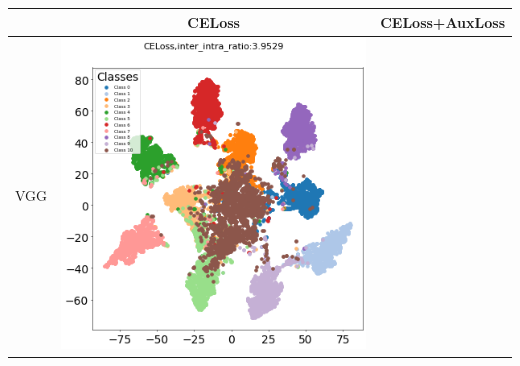 \begin{table}[H]
\captionsetup{font=small, justification=centering} %
\centering
\begin{tabular}{|c|c|c|}
\hline
\textbf{} & \textbf{CELoss} & \textbf{CELoss+AuxLoss} \\ \hline %
\begin{minipage}{0.1\textwidth} \centering VGG \end{minipage} & 
\begin{minipage}{0.45\textwidth} \centering \includegraphics[width=\textwidth]{assets/vgg16_tsne_feature.png} \end{minipage} & 

\end{tabular}
\end{table}
